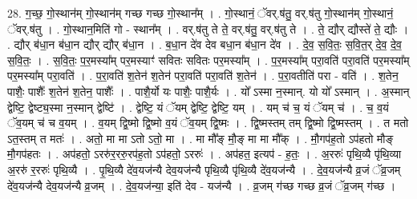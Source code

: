 \documentclass[17pt]{extarticle}
\begin{document}
28. ग॒च्छ॒ गो॒स्थान॑म् गो॒स्थान॑म् गच्छ गच्छ गो॒स्थान᳚म् । . गो॒स्थानं॒ ॅवर्.ष॑तु॒ वर्.ष॑तु गो॒स्थान॑म् गो॒स्थानं॒ ॅवर्.ष॑तु । . गो॒स्थान॒मिति॑ गो - स्थान᳚म् । . वर्.ष॑तु ते ते॒ वर्.ष॑तु॒ वर्.ष॑तु ते । . ते॒ द्यौर् द्यौस्ते॑ ते॒ द्यौः । . द्यौर् ब॑धा॒न ब॑धा॒न द्यौर् द्यौर् ब॑धा॒न । . ब॒धा॒न दे॑व देव बधा॒न ब॑धा॒न दे॑व । . दे॒व॒ स॒वि॒तः॒ स॒वि॒त॒र् दे॒व॒ दे॒व॒ स॒वि॒तः॒ । . स॒वि॒तः॒ प॒र॒मस्या᳚म् पर॒मस्याꣳ॑ सवितः सवितः पर॒मस्या᳚म् । . प॒र॒मस्या᳚म् परा॒वति॑ परा॒वति॑ पर॒मस्या᳚म् पर॒मस्या᳚म् परा॒वति॑ । . प॒रा॒वति॑ श॒तेन॑ श॒तेन॑ परा॒वति॑ परा॒वति॑ श॒तेन॑ । . प॒रा॒वतीति॑ परा - वति॑ । . श॒तेन॒ पाशैः॒ पाशैः᳚ श॒तेन॑ श॒तेन॒ पाशैः᳚ । . पाशै॒र्यो यः पाशैः॒ पाशै॒र्यः । . यो᳚ ऽस्मा न॒स्मान्. यो यो᳚ ऽस्मान् । . अ॒स्मान् द्वेष्टि॒ द्वेष्ट्य॒स्मा न॒स्मान् द्वेष्टि॑ । . द्वेष्टि॒ यं ॅयम् द्वेष्टि॒ द्वेष्टि॒ यम् । . यम् च॑ च॒ यं ॅयम् च॑ । . च॒ व॒यं ॅव॒यम् च॑ च व॒यम् । . व॒यम् द्वि॒ष्मो द्वि॒ष्मो व॒यं ॅव॒यम् द्वि॒ष्मः । . द्वि॒ष्मस्तम् तम् द्वि॒ष्मो द्वि॒ष्मस्तम् । . त मतो ऽत॒स्तम् त मतः॑ । . अतो॒ मा मा ऽतो ऽतो॒ मा । . मा मौ᳚ङ् मौ॒ङ् मा मा मौ᳚क् । . मौ॒गप॑ह॒तो ऽप॑हतो मौङ् मौ॒गप॑हतः । . अप॑हतो॒ ऽररु॑र॒ररु॒रप॑ह॒तो ऽप॑हतो॒ ऽररुः॑ । . अप॑हत॒ इत्यप॑ - ह॒तः॒ । . अ॒ररुः॑ पृथि॒व्यै पृ॑थि॒व्या अ॒ररु॑ र॒ररुः॑ पृथि॒व्यै । . पृ॒थि॒व्यै दे॑व॒यज॑न्यै देव॒यज॑न्यै पृथि॒व्यै पृ॑थि॒व्यै दे॑व॒यज॑न्यै । . दे॒व॒यज॑न्यै व्र॒जं ॅव्र॒जम् दे॑व॒यज॑न्यै देव॒यज॑न्यै व्र॒जम् । . दे॒व॒यज॑न्या॒ इति॑ देव - यज॑न्यै । . व्र॒जम् ग॑च्छ गच्छ व्र॒जं ॅव्र॒जम् ग॑च्छ । \newline
\end{document}
